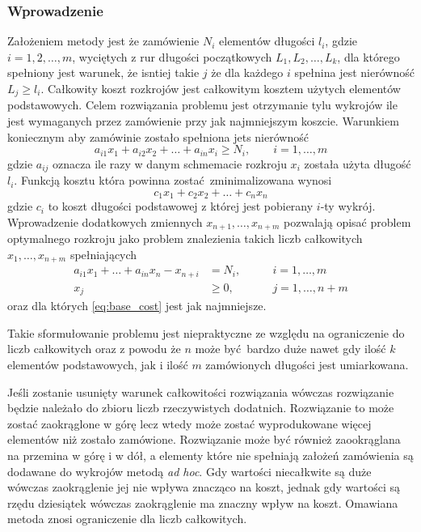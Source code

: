 \subsubsection{Wprowadzenie}
Założeniem metody jest że zamówienie $N_i$ elementów długości $l_i$, gdzie $i=1,2,\dots,m$, wyciętych z rur długości początkowych $L_1, L_2, \dots, L_k$, dla którego spełniony jest warunek, że isntiej takie $j$ że dla każdego $i$ spełnina jest nierówność $L_j \ge l_i$. Całkowity koszt rozkrojów jest całkowitym kosztem użytych elementów podstawowych. Celem rozwiązania problemu jest otrzymanie tylu wykrojów ile jest wymaganych przez zamówienie przy jak najmniejszym koszcie. Warunkiem koniecznym aby zamówinie zostało spełniona jets nierówność
\begin{equation*}
a_{i1}x_1 + a_{i2}x_2 + \dots + a_{in}x_i \ge N_i, \qquad i = 1, \dots, m
\end{equation*}
gdzie $a_{ij}$ oznacza ile razy w danym schmemacie rozkroju $x_i$ została użyta długość $l_i$. Funkcją kosztu która powinna zostać zminimalizowana wynosi
\begin{equation}\label{eq:base_cost}
  c_1x_1 + c_2x_2+\dots+c_nx_n
\end{equation}
gdzie  $c_i$ to koszt długości podstawowej z której jest pobierany $i$-ty wykrój. Wprowadzenie dodatkowych zmiennych $x_{n+1},\dots,x_{n+m}$ pozwalają opisać problem optymalnego rozkroju jako problem znalezienia takich liczb całkowitych $x_1,\dots,x_{n+m}$ spełniających
\begin{align}
    a_{i1}x_1+\dots+a_{in}x_n-x_{n+i} & =N_i, & \qquad i=1,\dots,m  \label{eq:additional_base}\\
    x_j & \ge 0, & \qquad j=1,\dots,n+m \label{eq:additional_base_condition}
\end{align}
oraz dla których \cref{eq:base_cost} jest jak najmniejsze.

Takie sformułowanie problemu jest niepraktyczne ze względu na ograniczenie do liczb całkowitych oraz z powodu że $n$ może być bardzo duże nawet gdy ilość $k$ elementów podstawowych, jak i ilość $m$ zamówionych długości jest umiarkowana.

Jeśli zostanie usunięty warunek całkowitości rozwiązania wówczas rozwiązanie będzie należało do zbioru liczb rzeczywistych dodatnich. Rozwiązanie to może zostać zaokrąglone w górę lecz wtedy może zostać wyprodukowane więcej elementów niż zostało zamówione. Rozwiązanie może być również zaookrąglana na przemina w górę i w dół, a elementy które nie spełniają założeń zamówienia są dodawane do wykrojów metodą \textit{ad hoc}. Gdy wartości niecałkwite są duże wówczas zaokrąglenie jej nie wpływa znacząco na koszt, jednak gdy wartości są rzędu dziesiątek wówczas zaokrąglenie ma znaczny wpływ na koszt. Omawiana metoda znosi ograniczenie dla liczb całkowitych.

